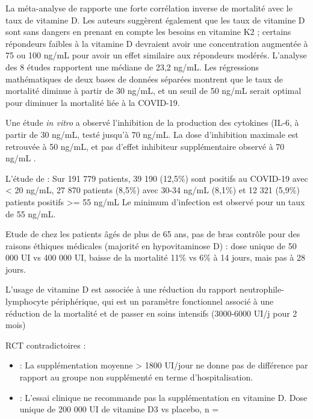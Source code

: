 \documentclass[
  a4paper,
  DIV=11,
  numbers=noendperiod,
  listof=totoc]{scrreprt}
\begin{document}
La méta-analyse de \textcite{Borsche.2021} rapporte une forte
corrélation inverse de mortalité avec le taux de vitamine D. Les auteurs
suggèrent également que les taux de vitamine D sont sans dangers en
prenant en compte les besoins en vitamine K2 ; certains répondeurs
faibles à la vitamine D devraient avoir une concentration augmentée à 75
ou 100 ng/mL pour avoir un effet similaire aux répondeurs modérés.
L'analyse des 8 études rapportent une médiane de 23,2 ng/mL. Les
régressions mathématiques de deux bases de données séparées montrent que
le taux de mortalité diminue à partir de 30 ng/mL, et un seuil de 50
ng/mL serait optimal pour diminuer la mortalité liée à la COVID-19.

Une étude \emph{in vitro} a observé l'inhibition de la production des
cytokines (IL-6, à partir de 30 ng/mL, testé jusqu'à 70 ng/mL. La dose
d'inhibition maximale est retrouvée à 50 ng/mL, et pas d'effet
inhibiteur supplémentaire observé à 70 ng/mL \autocite{Zhang.2012}.

L'étude de \textcite{Kaufman.2020} : Sur 191 779 patients, 39 190
(12,5\%) sont positifs au COVID-19 avec \textless{} 20 ng/mL, 27 870
patients (8,5\%) avec 30-34 ng/mL (8,1\%) et 12 321 (5,9\%) patients
positifs \textgreater= 55 ng/mL Le minimum d'infection est observé pour
un taux de 55 ng/mL.

Etude de \textcite{Annweiler.2022} chez les patients âgés de plus de 65
ans, pas de bras contrôle pour des raisons éthiques médicales (majorité
en hypovitaminose D) : dose unique de 50 000 UI vs 400 000 UI, baisse de
la mortalité 11\% vs 6\% à 14 jours, mais pas à 28 jours.

L'usage de vitamine D est associée à une réduction du rapport
neutrophile-lymphocyte périphérique, qui est un paramètre fonctionnel
associé à une réduction de la mortalité et de passer en soins intensifs
(3000-6000 UI/j pour 2 mois) \autocite{Maghbooli.2021}

RCT contradictoires :

\begin{itemize}
\item
  \textcite{Cereda.2021} : La supplémentation moyenne \textgreater{}
  1800 UI/jour ne donne pas de différence par rapport au groupe non
  supplémenté en terme d'hospitalisation.
\item
  \textcite{Murai.2021} : L'essai clinique ne recommande pas la
  supplémentation en vitamine D. Dose unique de 200 000 UI de vitamine
  D3 vs placebo, n =
\end{itemize}
\end{document}
